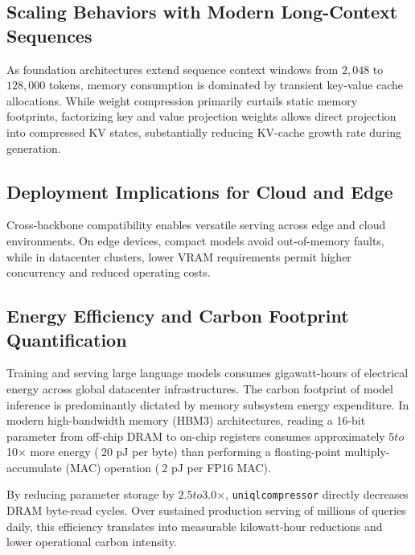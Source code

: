 \subsection{Scaling Behaviors with Modern Long-Context Sequences}
As foundation architectures extend sequence context windows from $2{,}048$ to $128{,}000$ tokens, memory consumption is dominated by transient key-value cache allocations. While weight compression primarily curtails static memory footprints, factorizing key and value projection weights allows direct projection into compressed KV states, substantially reducing KV-cache growth rate during generation.

\subsection{Deployment Implications for Cloud and Edge}
Cross-backbone compatibility enables versatile serving across edge and cloud environments. On edge devices, compact models avoid out-of-memory faults, while in datacenter clusters, lower VRAM requirements permit higher concurrency and reduced operating costs.

\subsection{Energy Efficiency and Carbon Footprint Quantification}
Training and serving large language models consumes gigawatt-hours of electrical energy across global datacenter infrastructures. The carbon footprint of model inference is predominantly dictated by memory subsystem energy expenditure. In modern high-bandwidth memory (HBM3) architectures, reading a 16-bit parameter from off-chip DRAM to on-chip registers consumes approximately $5$\times$ to $10$\times$ more energy ($~20$ pJ per byte) than performing a floating-point multiply-accumulate (MAC) operation ($~2$ pJ per FP16 MAC).

By reducing parameter storage by $2.5$\times$ to $3.0$\times$, \texttt{uniqlcompressor} directly decreases DRAM byte-read cycles. Over sustained production serving of millions of queries daily, this efficiency translates into measurable kilowatt-hour reductions and lower operational carbon intensity.

